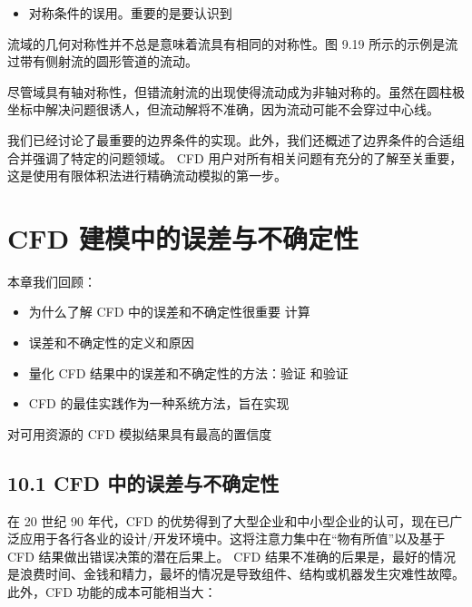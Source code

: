 \documentclass[11pt,a4paper,openany,fontset=none]{ctexbook}
\begin{document}
\begin{itemize}

\item 对称条件的误用。重要的是要认识到

\end{itemize}

流域的几何对称性并不总是意味着流具有相同的对称性。图 9.19 所示的示例是流过带有侧射流的圆形管道的流动。

尽管域具有轴对称性，但错流射流的出现使得流动成为非轴对称的。虽然在圆柱极坐标中解决问题很诱人，但流动解将不准确，因为流动可能不会穿过中心线。

我们已经讨论了最重要的边界条件的实现。此外，我们还概述了边界条件的合适组合并强调了特定的问题领域。 CFD 用户对所有相关问题有充分的了解至关重要，这是使用有限体积法进行精确流动模拟的第一步。

\chapter{CFD 建模中的误差与不确定性}

本章我们回顾：

\begin{itemize}

\item 为什么了解 CFD 中的误差和不确定性很重要 计算

\item 误差和不确定性的定义和原因

\item 量化 CFD 结果中的误差和不确定性的方法：验证 和验证

\item CFD 的最佳实践作为一种系统方法，旨在实现

\end{itemize}

对可用资源的 CFD 模拟结果具有最高的置信度

\section*{10.1 CFD 中的误差与不确定性}

在 20 世纪 90 年代，CFD 的优势得到了大型企业和中小型企业的认可，现在已广泛应用于各行各业的设计/开发环境中。这将注意力集中在“物有所值”以及基于 CFD 结果做出错误决策的潜在后果上。 CFD 结果不准确的后果是，最好的情况是浪费时间、金钱和精力，最坏的情况是导致组件、结构或机器发生灾难性故障。此外，CFD 功能的成本可能相当大：
\end{document}

